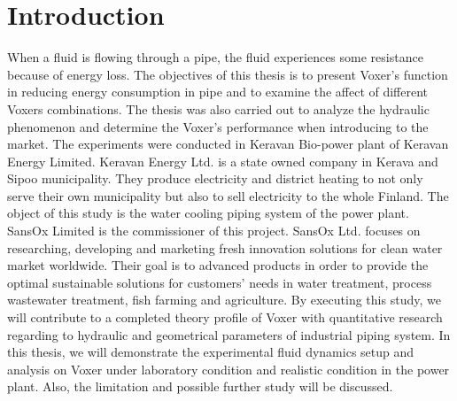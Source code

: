 
\chapter{Introduction}

When a fluid is flowing through a pipe, the fluid experiences some resistance because of energy loss.  \newline
The objectives of this thesis is to present Voxer's function in reducing energy consumption in pipe and to examine the affect of different Voxers combinations. The thesis was also carried out to analyze the hydraulic phenomenon and determine the Voxer's performance when introducing to the market. \newline
The experiments were conducted in Keravan Bio-power plant of Keravan Energy Limited. Keravan Energy Ltd. is a state owned company in Kerava and Sipoo municipality. They produce electricity and district heating to not only serve their own municipality but also to sell electricity to the whole Finland. The object of this study is the water cooling piping system of the power plant.\newline
SansOx Limited is the commissioner of this project. SansOx Ltd. focuses on researching, developing and marketing fresh innovation solutions for clean water market worldwide. Their goal is to advanced products in order to provide the optimal sustainable solutions for customers' needs in water treatment, process wastewater treatment, fish farming and agriculture. By executing this study, we will contribute to a completed theory profile of Voxer with quantitative research regarding to hydraulic and geometrical parameters of industrial piping system. \newline
In this thesis, we will demonstrate the experimental fluid dynamics setup and analysis on Voxer under laboratory condition and realistic condition in the power plant. Also, the limitation and possible further study will be discussed. 

\clearpage %
